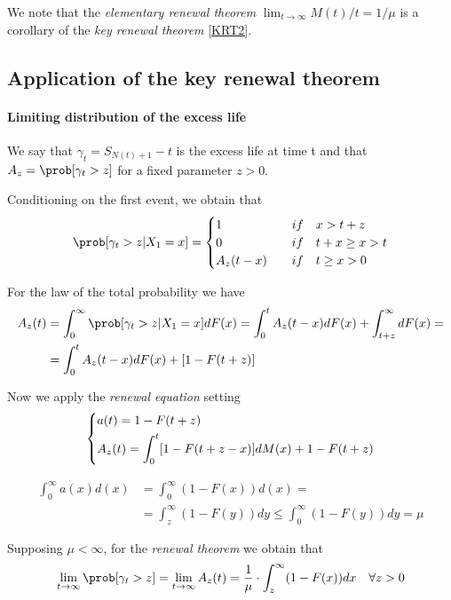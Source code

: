 We note that the \textit{elementary renewal theorem} $\lim_{t \to \infty} M(t) / t = 1 / \mu$ is a corollary of the \textit{key renewal theorem} \ref{KRT2}.

\subsection{Application of the key renewal theorem}

\paragraph{Limiting distribution of the excess life}

We say that $\gamma_{t}=S_{N(t)+1}-t$ is the excess life at time t and that $A_z=\prob[\gamma_t>z]$ for a fixed parameter $z>0$.

Conditioning on the first event, we obtain that
\begin{equation*}
	\prob[\gamma_t>z|X_1=x] = \begin{cases}
		1 \quad & if \quad x > t+z \\
		0 \quad & if \quad t+x \geq x > t \\
		A_z(t-x) \quad & if \quad t \geq x > 0
	\end{cases}
\end{equation*}

For the law of the total probability we have
\begin{align*}
	A_z(t) &= \int_{0}^{\infty} \prob[\gamma_t>z|X_1=x] dF(x) = \int_{0}^{t}A_z(t-x)dF(x)+\int_{t+z}^{\infty}dF(x)= \\
	&= \int_{0}^{t}A_z(t-x)dF(x)+ [1-F(t+z)]
\end{align*}

Now we apply the \textit{renewal equation} setting
\begin{equation} \begin{dcases}
	a(t) = 1 - F(t+z) \\
	A_z(t)=\int_{0}^{t} [1-F(t+z-x)] dM(x)+1-F(t+z)
\end{dcases} \end{equation}

\begin{align*}
	\int_{0}^{\infty} a(x) d(x) & = \int_{0}^{\infty}(1-F(x)) d(x) = \\
	& = \int_{z}^{\infty}(1-F(y))dy \leq \int_{0}^{\infty}(1-F(y))dy = \mu
\end{align*}

Supposing $\mu < \infty$, for the \textit{renewal theorem} we obtain that
\begin{equation}
	\lim_{t \rightarrow \infty} \prob[\gamma_t>z] = \lim_{t \rightarrow \infty} A_z(t) = \frac{1}{\mu} \cdot \int_z^{\infty}(1-F(x))dx \quad \forall z > 0
	\label{limitingdistribution}
\end{equation}

